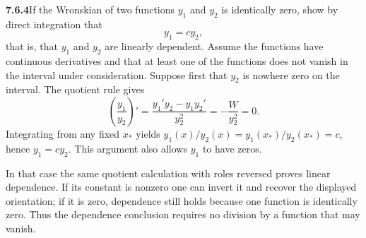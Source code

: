 \par\bigskip
\noindent\textbf{7.6.4}\quad If the Wronskian of two functions $y_{1}$ and
$y_{2}$ is identically zero, show by direct integration that
\[
y_{1}=cy_{2},
\]
that is, that $y_{1}$ and $y_{2}$ are linearly dependent. Assume the functions
have continuous derivatives and that at least one of the functions does not
vanish in the interval under consideration.
\solution
Suppose first that $y_2$ is nowhere zero on the interval.
The quotient rule gives
\[
\left(\frac{y_1}{y_2}\right)'
=\frac{y_1'y_2-y_1y_2'}{y_2^2}=-\frac W{y_2^2}=0.
\]
Integrating from any fixed $x_*$ yields
$y_1(x)/y_2(x)=y_1(x_*)/y_2(x_*)=c$, hence
$\boxed{y_1=cy_2}$. This argument also allows $y_1$ to have zeros.

In that case the same quotient calculation with roles reversed proves
linear dependence. If its constant is nonzero one can invert it and
recover the displayed orientation; if it is zero, dependence still holds
because one function is identically zero. Thus the dependence
conclusion requires no division by a function that may vanish.


